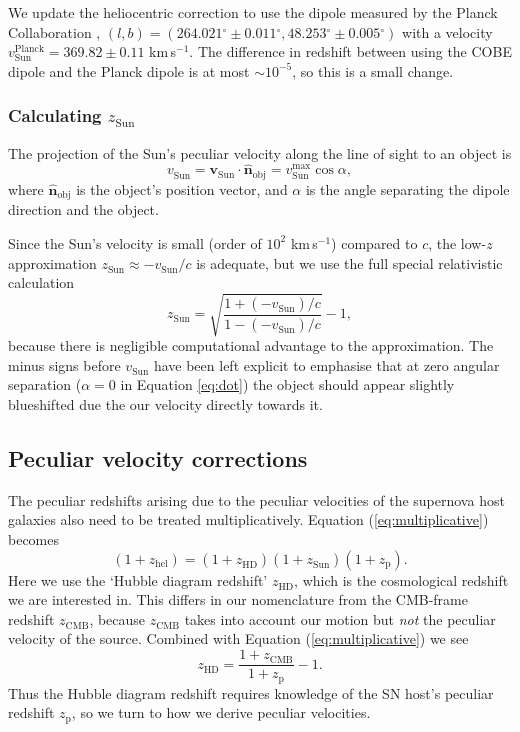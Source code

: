 \documentclass[
  journal=pasa,
  manuscript=research-paper,
  year=2022,
]{cup-journal}
\newcommand{\zCMB}[1]{\ensuremath{z_{\text{CMB}}^{\mathrm{#1}}}}
\newcommand{\zHD}[1]{\ensuremath{z_{\text{HD}}^{\mathrm{#1}}}}
\newcommand{\zSun}[1]{\ensuremath{z_{\text{Sun}}^{\mathrm{#1}}}}
\newcommand\zhel{\ensuremath{z_{\text{hel}}}}
\newcommand\dg{\ensuremath{^{\circ}}}
\newcommand\vSun[1]{\ensuremath{v_{\text{Sun}}^{\mathrm{#1}}}}
\newcommand\voP{\ensuremath{v_{\text{Sun}}^{\text{Planck}}}}
\newcommand{\zp}{\ensuremath{z_{\text{p}}}}
\newcommand{\ten}[1]{\ensuremath{10^{#1}}}
\newcommand{\kms}{km\,s$^{-1}$}
\begin{document}
We update the heliocentric correction to use the dipole measured by the Planck Collaboration \citep{Planck2018}, $(l, b) = (264.021\dg{}\pm0.011\dg{}, 48.253\dg{}\pm0.005\dg{})$ with a velocity $\voP = 369.82\pm0.11$ \kms{}.
The difference in redshift between using the COBE dipole and the Planck dipole is at most $\sim\ten{-5}$, so this is a small change.

\subsubsection{Calculating \zSun{}}
The projection of the Sun's peculiar velocity along the line of sight to an object is
\begin{equation} \label{eq:dot}
    \vSun{} = \bm{v}_{\text{Sun}}\cdot\hat{\bm{n}}_{\text{obj}} = \vSun{max}\cos\alpha, \end{equation}
where $\hat{\bm{n}}_{\text{obj}}$ is the object's position vector, and $\alpha$ is the angle separating the dipole direction and the object.

Since the Sun's velocity is small (order of \ten{2} \kms{}) compared to $c$, the low-$z$ approximation $\zSun{} \approx -\vSun{}/c$ is adequate, but we use the full special relativistic calculation 
\begin{equation} \zSun{} = \sqrt{\frac{1+(-\vSun{})/c}{1-(-\vSun{})/c}}-1,\end{equation} 
because there is negligible computational advantage to the approximation.
The minus signs before \vSun{} have been left explicit to emphasise that at zero angular separation ($\alpha=0$ in Equation \ref{eq:dot}) the object should appear slightly blueshifted due the our velocity directly towards it.

\subsection{Peculiar velocity corrections}

The peculiar redshifts arising due to the peculiar velocities of the supernova host galaxies also need to be treated multiplicatively.
Equation (\ref{eq:multiplicative}) becomes
\begin{equation} \label{eq:multiplicativeHD} 
(1+\zhel{})=(1+\zHD{})(1+\zSun{})(1+\zp{}). 
\end{equation}
Here we use the `Hubble diagram redshift' \zHD{}, which is the cosmological redshift we are interested in.
This differs in our nomenclature from the CMB-frame redshift \zCMB{}, because \zCMB{} takes into account our motion but {\em not} the peculiar velocity of the source.
Combined with Equation (\ref{eq:multiplicative})  we see
\begin{equation}
\zHD{}=\frac{1+\zCMB{}}{1+\zp{}} -1.
\label{eq:correct_dist}
\end{equation}
Thus the Hubble diagram redshift requires knowledge of the SN host's peculiar redshift \zp{}, so we turn to how we derive peculiar velocities.
\end{document}
